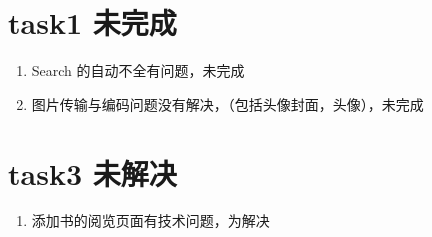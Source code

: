 \documentclass{ctexart}
\begin{document}
    \section{task1 未完成}
    \begin{enumerate}
        \item Search 的自动不全有问题，未完成
        \item 图片传输与编码问题没有解决，（包括头像封面，头像），未完成
      
    \end{enumerate}
    
    \section{task3 未解决}
    \begin{enumerate}
        \item 添加书的阅览页面有技术问题，为解决
    \end{enumerate}
\end{document}

